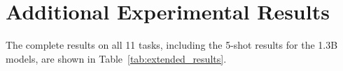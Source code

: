 \vspace{-2mm}
\section{Additional Experimental Results}
\label{app:d}

The complete results on all 11 tasks, including the 5-shot results for the 1.3B models, are shown in Table~\ref{tab:extended_results}.



